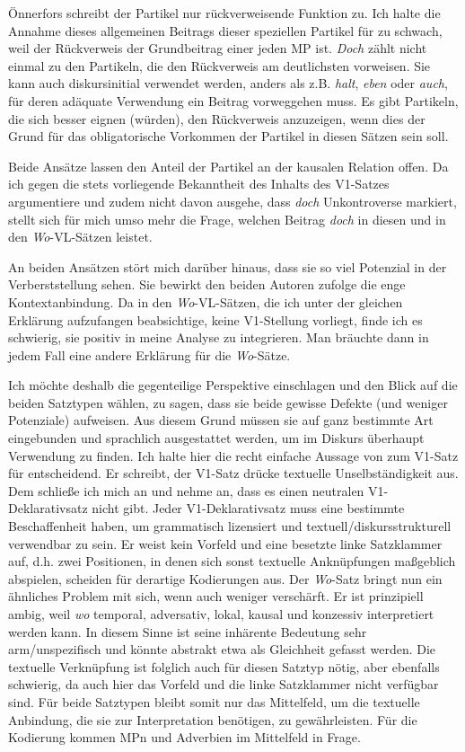 {Önnerfors schreibt der Partikel nur rückverweisende Funktion zu. Ich halte die Annahme dieses allgemeinen Beitrags dieser speziellen Partikel für zu schwach, weil der Rückverweis der Grundbeitrag einer jeden MP ist. \textit{Doch} zählt nicht einmal zu den Partikeln, die den Rückverweis am deutlichsten vorweisen. Sie kann auch diskursinitial verwendet werden, anders als z.B. \textit{halt}, \textit{eben} oder \textit{auch}, für deren adäquate Verwendung ein Beitrag vorweggehen muss. Es gibt Partikeln, die sich besser eignen (würden), den Rückverweis anzuzeigen, wenn dies der Grund für das obligatorische Vorkommen der Partikel in diesen Sätzen sein soll.

Beide Ansätze lassen den Anteil der Partikel an der kausalen Relation offen. Da ich gegen die stets vorliegende Bekanntheit des Inhalts des V1-Satzes argumentiere und zudem nicht davon ausgehe, dass \textit{doch} Unkontroverse markiert, stellt sich für mich umso mehr die Frage, welchen Beitrag \textit{doch} in diesen und in den \textit{Wo}-VL-Sätzen leistet. 

An beiden Ansätzen stört mich darüber hinaus, dass sie so viel Potenzial in der Verberststellung sehen. Sie bewirkt den beiden Autoren zufolge die enge Kontextanbindung. Da in den \textit{Wo}-VL-Sätzen, die ich unter der gleichen Erklärung aufzufangen beabsichtige, keine V1-Stellung vorliegt, finde ich es schwierig, sie positiv in meine Analyse zu integrieren. Man bräuchte dann in jedem Fall eine andere Erklärung für die \textit{Wo}-Sätze.

Ich möchte deshalb die gegenteilige Perspektive einschlagen und den Blick auf die beiden Satztypen wählen, zu sagen, dass sie beide gewisse \glq Defekte\grq {} (und weniger Potenziale) aufweisen. Aus diesem Grund müssen sie auf ganz be\-stimmte Art eingebunden und sprachlich ausgestattet werden, um im Diskurs überhaupt Verwendung zu finden. Ich halte hier die recht einfache Aussage von \citet[250]{Scheutz2009} zum V1-Satz für entscheidend. Er schreibt, der V1-Satz drücke \glqq textuelle Unselbständigkeit\grqq{} aus. Dem schließe ich mich an und nehme an, dass es einen \glq neutralen\grq {} V1-Deklarativsatz nicht gibt. Jeder V1-Deklarativsatz  muss eine bestimmte Beschaffenheit haben, um grammatisch lizensiert und textuell/diskurs\-strukturell verwendbar zu sein. Er weist kein Vorfeld und eine besetzte linke Satzklammer auf, d.h. zwei Positionen, in denen sich sonst textuelle Anknüpfungen maßgeblich abspielen, scheiden für derartige Kodierungen aus. Der \textit{Wo}-Satz bringt nun ein ähnliches Problem mit sich, wenn auch weniger verschärft. Er ist prinzipiell ambig, weil \textit{wo} temporal, adversativ, lokal, kausal und konzessiv interpretiert werden kann. In diesem Sinne ist seine inhärente Bedeutung sehr arm/unspezifisch und könnte abstrakt etwa als \glq Gleichheit\grq {} gefasst werden. Die textuelle Verknüpfung ist folglich auch für diesen Satztyp nötig, aber ebenfalls schwierig, da auch hier das Vorfeld und die linke Satzklammer nicht verfügbar sind. Für beide Satztypen bleibt somit nur das Mittelfeld, um die textuelle Anbindung, die sie zur Interpretation benötigen, zu gewährleisten. Für die Kodierung kommen MPn und Adverbien im Mittelfeld in Frage.

}
